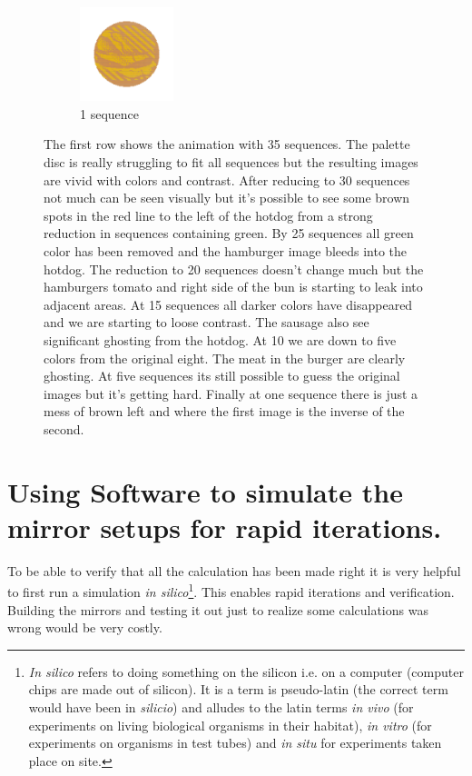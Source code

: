 \documentclass{article}
\begin{document}
\begin{figure}[ht!]
\begin{subfigure}[t]{0.4\textwidth}
\includegraphics[width=0.3\textwidth]{images/reduction/1/sim1.png}
\caption{1 sequence}
\end{subfigure}

\caption{ The first row shows the animation with 35 sequences. The palette disc is really struggling to fit all sequences but the resulting images are vivid with colors and contrast. After reducing to 30 sequences not much can be seen visually but it's possible to see some brown spots in the red line to the left of the hotdog from a strong reduction in sequences containing green. By 25 sequences all green color has been removed and the hamburger image bleeds into the hotdog. The reduction to 20 sequences doesn't change much but the hamburgers tomato and right side of the bun is starting to leak into adjacent areas. At 15 sequences all darker colors have disappeared and we are starting to loose contrast. The sausage also see significant ghosting from the hotdog. At 10 we are down to five colors from the original eight. The meat in the burger are clearly ghosting. At five sequences its still possible to guess the original images but it's getting hard. Finally at one sequence there is just a mess of brown left and where the first image is the inverse of the second.}
\label{fig:reducing}
\end{figure}



\section{Using Software to simulate the mirror setups for rapid iterations.}

To be able to verify that all the calculation has been made right it is
very helpful to first run a simulation \emph{in silico}\footnote{\emph{In
  silico} refers to doing something on the silicon i.e. on a computer
  (computer chips are made out of silicon). It is a term is pseudo-latin
  (the correct term would have been in \emph{silicio}) and alludes to
  the latin terms \emph{in vivo} (for experiments on living biological
  organisms in their habitat), \emph{in vitro} (for experiments on
  organisms in test tubes) and \emph{in situ} for experiments taken
  place on site.}. This enables rapid iterations and verification.
Building the mirrors and testing it out just to realize some
calculations was wrong would be very costly.
\end{document}
